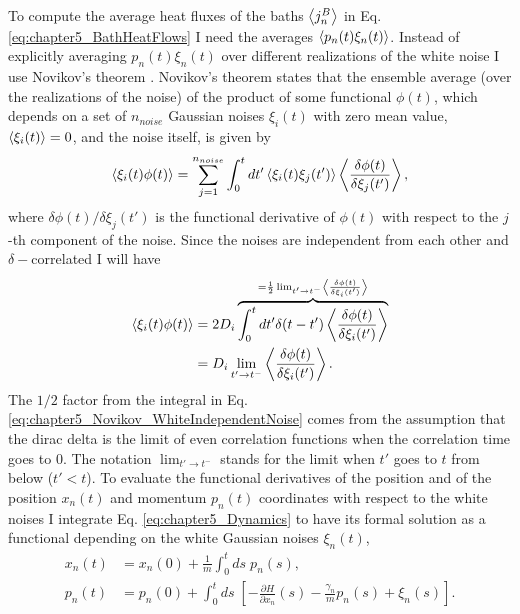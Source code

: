 To compute the average heat fluxes of the baths $\expval{j^B_n}$ in Eq. \eqref{eq:chapter5_BathHeatFlows} I need
the averages $\expval{p_n(t)\xi_n(t)}$. Instead of explicitly averaging $p_n(t)\xi_n(t)$ over different realizations of the white noise I use Novikov's theorem \cite{Novikov1965,Ma2011,Toral2014}. Novikov's theorem states that the ensemble average (over  the realizations of the noise) of the product of some functional $\phi(t)$, which depends on a set of
$n_{noise}$ Gaussian noises $\xi_i(t)$ with zero mean value, $\expval{\xi_i(t)} = 0$, and the noise itself, is given by
%
\begin{equation}
    \expval{\xi_i(t)\phi(t)} = \sum_{j=1}^{n_{noise}}\int_0^t dt' \expval{\xi_i(t)\xi_j(t')} \expval{\frac{\delta \phi(t)}{\delta\xi_j(t')}},
    \label{eq:chapter5_Novikov_GeneralExpression}
\end{equation}
%
where ${\delta \phi(t)}/{\delta\xi_j(t')}$ is the functional derivative of $\phi(t)$ with respect to the $j$-th component of the noise. Since the noises are independent from each other and $\delta-$correlated I will have
%
\begin{equation}
  \begin{split}
    \expval{\xi_i(t)\phi(t)} &= 2D_i \overbrace{\int_0^t dt' \delta(t-t') \expval{\frac{\delta \phi(t)}{\delta\xi_i(t')}}}^{= \frac{1}{2} \lim_{t'\to t^-} \expval{\frac{\delta \phi(t)}{\delta\xi_i(t')}} }\\
    &=D_i \lim_{t'\to t^-} \expval{ \frac{\delta \phi(t)}{\delta\xi_i(t')} }.
  \end{split}
  \label{eq:chapter5_Novikov_WhiteIndependentNoise}
\end{equation}
%
The $1/2$ factor from the integral in Eq. \eqref{eq:chapter5_Novikov_WhiteIndependentNoise} comes from the assumption that the dirac delta is the limit of even correlation functions when the correlation time goes to 0. The notation $\lim_{t'\to t^-}$ stands for the limit when $t'$ goes to $t$ from below ($t'<t$). To evaluate the functional derivatives of the position and of the position $x_n(t)$ and momentum $p_n(t)$ coordinates with respect to the white noises I integrate Eq. \eqref{eq:chapter5_Dynamics} to have its formal solution as a functional depending on the white Gaussian noises $\xi_n(t)$,
%
\begin{equation}
    \begin{split}
        x_n(t) &= x_n(0) +  \frac{1}{m}\int_0^t ds\; p_n(s) ,\\
        p_n(t) &= p_n(0) + \int_0^t ds\; \left[ -\frac{\partial H}{\partial x_n}(s) - \frac{\gamma_n}{m}p_n(s) + \xi_n(s)\right].
    \end{split}
    \label{eq:chapter5_FormalSolution}
\end{equation}
